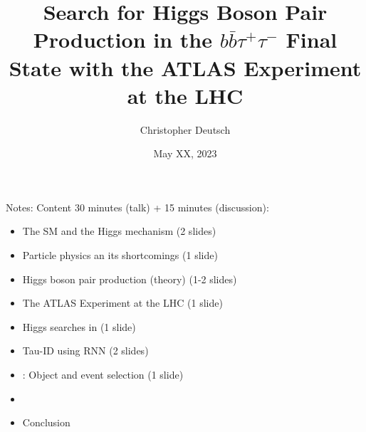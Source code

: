 \documentclass[11pt, xcolor={dvipsnames}, aspectratio=169]{beamer}
\author{Christopher Deutsch}
\institute{University of Bonn}
\date{May XX, 2023}
\title{Search for Higgs Boson Pair Production in the $b\bar{b}\tau^+\tau^-$
  Final State with the ATLAS Experiment at the LHC}
\begin{document}
\maketitle

\begin{frame}{Notes: Content}
  30 minutes (talk) + 15 minutes (discussion):
  \begin{itemize}
  \item The SM and the Higgs mechanism (2 slides)
  \item Particle physics an its shortcomings (1 slide)
  \item Higgs boson pair production (theory) (1-2 slides)
  \item The ATLAS Experiment at the LHC (1 slide)
  \item Higgs searches in \bbtautau (1 slide)
  \item Tau-ID using RNN (2 slides)
  \item \bbtautau: Object and event selection (1 slide)
  \item
  \item Conclusion
  \end{itemize}
\end{frame}
\end{document}
